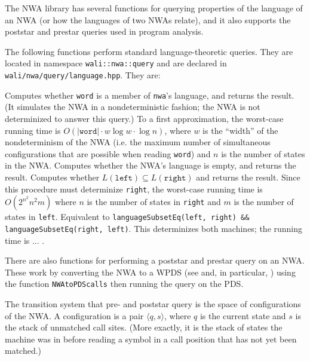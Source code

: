 The NWA library has several functions for querying
properties of the language of an NWA (or how the languages of two NWAs
relate), and it also supports
the poststar and prestar queries used in program analysis.

The following functions perform standard language-theoretic queries. They are
located in namespace \texttt{wali::nwa::query} and are declared in
\texttt{wali/nwa/query/language.hpp}. They are:
\begin{functionlist}
   Computes whether \texttt{word} is a member of
    \texttt{nwa}'s language, and returns the result. (It simulates the
    NWA in a nondeterministic fashion; the NWA is not determinized to answer
    this query.) To a first approximation, the worst-case running time is
    $O(|\texttt{word}|\cdot w\log w\cdot\log n)$, where $w$ is the ``width'' of
    the nondeterminism of the NWA (i.e. the maximum number of
    simultaneous configurations that are possible when reading \texttt{word})
    and $n$ is the number of states in the NWA.
   Computes
    whether the NWA's language is empty, and returns the result.
    Computes whether $L(\texttt{left}) \subseteq L(\texttt{right})$
    and returns the result. Since this procedure must determinize \texttt{right},
    the worst-case running time is $O(2^{n^2}n^2m)$ where $n$ is the number of
    states in \texttt{right} and $m$ is the number of states in \texttt{left}.
    Equivalent to \texttt{languageSubsetEq(left, right) \&\&
    languageSubsetEq(right, left)}. This determinizes both machines; the
    running time is ... .
\end{functionlist}

There are also functions for performing a poststar and prestar
query on an NWA. These work by converting the NWA to a WPDS (see
 and, in particular, ) using
the function \texttt{NWAtoPDScalls} then running the query on the PDS.

The transition system that pre- and poststar query is the space of
configurations of the NWA. A configuration is a pair $\langle q, s\rangle$,
where $q$ is the current state and $s$ is the stack of unmatched call
sites. (More exactly, it is the stack of states the machine was in before
reading a symbol in a call position that has not yet been matched.)

